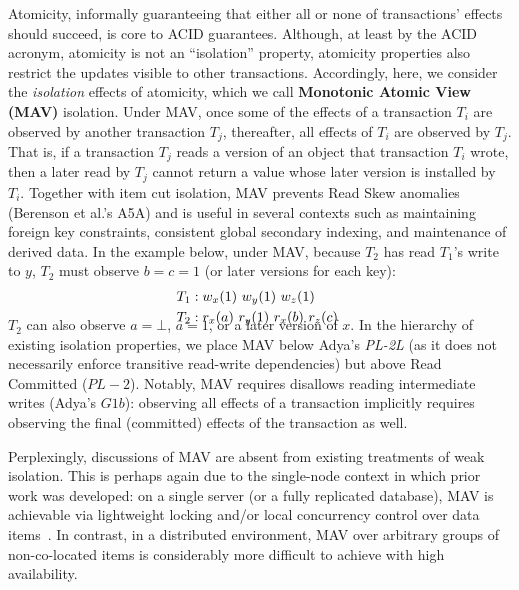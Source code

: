 Atomicity, informally guaranteeing that either all or none of
transactions' effects should succeed, is core to ACID
guarantees. Although, at least by the ACID acronym, atomicity is not
an ``isolation'' property, atomicity properties also restrict the
updates visible to other transactions. Accordingly, here, we consider
the \textit{isolation} effects of atomicity, which we call
\textbf{Monotonic Atomic View (MAV)} isolation.  Under MAV, once some of the
effects of a transaction $T_i$ are observed by another transaction
$T_j$, thereafter, all effects of $T_i$ are observed by $T_j$. That
is, if a transaction $T_j$ reads a version of an object that
transaction $T_i$ wrote, then a later read by $T_j$ cannot return a
value whose later version is installed by $T_i$. Together with item
cut isolation, MAV prevents Read Skew anomalies (Berenson et al.'s A5A)
and is useful in several contexts such as maintaining foreign key
constraints, consistent global secondary indexing, and maintenance of
derived data. In the example below, under MAV, because $T_2$ has read
$T_1$'s write to $y$, $T_2$ must observe $b=c=1$ (or later versions
for each key):
\begin{align*}
\small
T_1 &: w_x(1)~w_y(1)~w_z(1)
\\T_2 &: r_x(a)~r_y(1)~r_x(b)~r_z(c)~\\[-1.5em]
\end{align*}
$T_2$ can also observe $a=\bot$, $a=1$, or a later version of $x$. In
the hierarchy of existing isolation properties, we place MAV below
Adya's \textit{PL-2L} (as it does not necessarily enforce transitive
read-write dependencies) but above Read Committed ($PL-2$). Notably,
MAV requires disallows reading intermediate writes (Adya's $G1b$):
observing all effects of a transaction implicitly requires observing
the final (committed) effects of the transaction as well.

Perplexingly, discussions of MAV are absent from existing treatments of
weak isolation. This is perhaps again due to the single-node context
in which prior work was developed: on a single server (or a fully
replicated database), MAV is achievable via lightweight locking and/or
local concurrency control over data items~\cite{gstore,
  kemme-thesis}. In contrast, in a distributed environment, MAV over
arbitrary groups of non-co-located items is considerably more difficult
to achieve with high availability.


